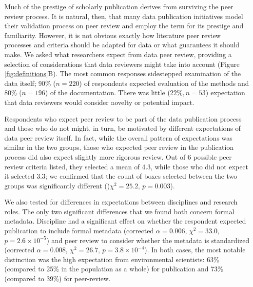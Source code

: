 \documentclass[10pt]{article}
\begin{document}
Much of the prestige of scholarly publication derives from surviving the peer review process.
It is natural, then, that many data publication initiatives model their validation process on peer review and employ the term for its prestige and familiarity.
However, it is not obvious exactly how literature peer review processes and criteria should be adapted for data or what guarantees it should make.
We asked what researchers expect from data peer review, providing a selection of considerations that data reviewers might take into account (Figure \ref{fig:definitions}B).
The most common responses sidestepped examination of the data itself; 90\% ($n=220$) of respondents expected evaluation of the methods and 80\% ($n=196$) of the documentation.
There was little ($22\%, n=53$) expectation that data reviewers would consider novelty or potential impact.

Respondents who expect peer review to be part of the data publication process and those who do not might, in turn, be motivated by different expectations of data peer review itself. 
In fact, while the overall pattern of expectations was similar in the two groups, those who expected peer review in the publication process did also expect slightly more rigorous review. 
Out of 6 possible peer review criteria listed, they selected a mean of 4.3, while those who did not expect it selected 3.3; we confirmed that the count of boxes selected between the two groups was significantly different ()$\chi^{2}= 25.2$, $p= 0.003$). 

We also tested for differences in expectations between disciplines and research roles. The only two significant differences that we found both concern formal metadata. Discipline had a significant effect on whether the respondent expected publication to include formal metadata (corrected $\alpha= 0.006$, $\chi^{2}= 33.0$, $p= 2.6\times10^{-5}$) and peer review to consider whether the metadata is standardized (corrected $\alpha= 0.008$, $\chi^{2}= 26.7$, $p= 3.8\times10^{-4}$). In both cases, the most notable distinction was the high expectation from environmental scientists: 63\% (compared to 25\% in the population as a whole) for publication and 73\% (compared to 39\%) for peer-review.
\end{document}
